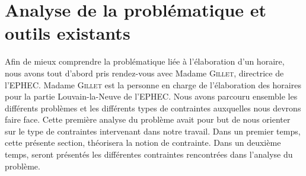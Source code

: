 
\chapter{Analyse de la problématique et outils existants}


Afin de mieux comprendre la problématique liée à l'élaboration d'un horaire, nous avons tout d'abord pris rendez-vous avec Madame \textsc{Gillet}, directrice de l'EPHEC. Madame \textsc{Gillet} est la personne en charge de l'élaboration des horaires pour la partie Louvain-la-Neuve de l'EPHEC. Nous avons parcouru ensemble les différents problèmes et les différents types de contraintes auxquelles nous devrons faire face. Cette première analyse du problème avait pour but de nous orienter sur le type de contraintes intervenant dans notre travail.
\newline
\indent
Dans un premier temps, cette présente section, théorisera la notion de contrainte. Dans un deuxième temps, seront présentés les différentes contraintes rencontrées dans l'analyse du problème. 

